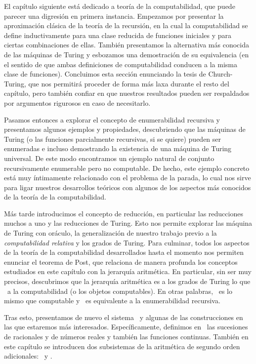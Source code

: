 \documentclass[../main.tex]{memoir}
\begin{document}
El capítulo siguiente está dedicado a teoría de la computabilidad, que puede parecer una digresión en primera instancia. Empezamos por presentar la aproximación clásica de la teoría de la recursión, en la cual la computabilidad se define inductivamente para una clase reducida de funciones iniciales y para ciertas combinaciones de ellas. También presentamos la alternativa más conocida de las máquinas de Turing y esbozamos una demostración de su equivalencia (en el sentido de que ambas definiciones de computabilidad conducen a la misma clase de funciones). Concluimos esta sección enunciando la tesis de Church-Turing, que nos permitirá proceder de forma más laxa durante el resto del capítulo, pero también confiar en que nuestros resultados pueden ser respaldados por argumentos rigurosos en caso de necesitarlo.

Pasamos entonces a explorar el concepto de enumerabilidad recursiva y presentamos algunos ejemplos y propiedades, descubriendo que las máquinas de Turing (o las funciones parcialmente recursivas, si se quiere) pueden ser enumeradas e incluso demostrando la existencia de una máquina de Turing universal. De este modo encontramos un ejemplo natural de conjunto recursivamente enumerable pero no computable. De hecho, este ejemplo concreto está muy íntimamente relacionado con el problema de la parada, lo cual nos sirve para ligar nuestros desarrollos teóricos con algunos de los aspectos más conocidos de la teoría de la computabilidad.

Más tarde introducimos el concepto de reducción, en particular las reducciones muchos a uno y las reducciones de Turing. Esto nos permite explorar las máquina de Turing con oráculo, la generalización de nuestro trabajo previo a la \textit{computabilidad relativa} y los grados de Turing. Para culminar, todos los aspectos de la teoría de la computabilidad desarrollados hasta el momento nos permiten enunciar el teorema de Post, que relaciona de manera profunda los conceptos estudiados en este capítulo con la jerarquía aritmética. En particular, sin ser muy precisos, descubrimos que la jerarquía aritmética es a los grados de Turing lo que \rca\ a la computabilidad (o los objetos computables). En otras palabras, \rec\ es lo mismo que computable y \re\ es equivalente a la enumerabilidad recursiva.

Tras esto, presentamos de nuevo el sistema \rca\ y algunas de las construcciones en las que estaremos más interesados. Específicamente, definimos en \rca\ las sucesiones de racionales y de números reales y también las funciones continuas. También en este capítulo se introducen dos subsistemas de la aritmética de segundo orden adicionales: \wkl\ y \aca.
\end{document}
